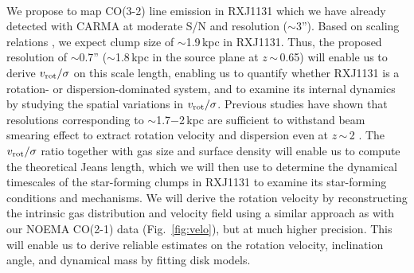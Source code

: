 \documentclass[11pt,a4paper,twoside,graphicx,color]{article}
\newcommand{\vs}{$v_{\rm rot}/\sigma$\xspace}
\newcommand{\bco}{\mbox{CO(2-1)}\xspace}
\newcommand{\cco}{\mbox{CO(3-2)}\xspace}
\newcommand{\Fig}[1]{Fig.~\ref{fig:#1}}
\newcommand{\ssim}{\,$\sim$\,}
\newcommand{\highz}{high-$z$\xspace}
\begin{document}
\vspace{0.2em}
 \\
\indent
We propose to map \cco line emission in RXJ1131
which we have already detected with CARMA at moderate S/N and resolution ($\sim$3'').
Based on scaling relations
\citep{Genzel11a}, %
we expect clump size of %
$\sim$1.9\,kpc in RXJ1131. %
Thus, the proposed resolution of $\sim$0.7'' ($\sim$1.8\,kpc in the source plane at $z$\ssim0.65) will enable us to derive \vs
on this scale length, enabling us to quantify whether RXJ1131 is a rotation- or dispersion-dominated system,
and to examine its internal dynamics by studying the spatial variations in \vs.
Previous studies have shown that resolutions corresponding to $\sim$1.7$-$2\,kpc are sufficient to withstand %
beam smearing effect to extract rotation velocity and
dispersion even at $z$\ssim2  \citep[e.g.][]{Newman13a, Genzel14a}.
The \vs ratio together with gas size and surface density will enable us to compute the theoretical Jeans length,
which we will then use to determine the dynamical timescales of the star-forming clumps in RXJ1131
to examine its star-forming conditions and mechanisms.
%
We will derive the rotation velocity by reconstructing the intrinsic gas distribution and velocity field using
a similar approach as with our NOEMA \bco data (\Fig{velo}), but at much higher precision.
This will enable us to derive reliable estimates on the rotation velocity, inclination angle, and
dynamical mass by fitting disk models.
\end{document}
